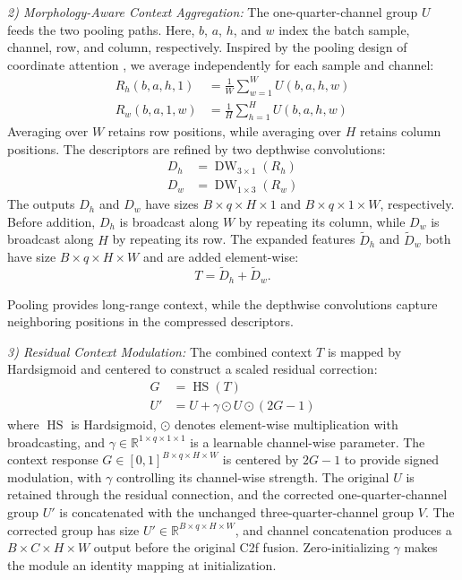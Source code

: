 \documentclass[journal]{IEEEtranTIE}
\begin{document}
\emph{2) Morphology-Aware Context Aggregation:}
The one-quarter-channel group $U$ feeds the two pooling paths. Here, $b$, $a$, $h$, and $w$ index the batch sample, channel, row, and column, respectively. Inspired by the pooling design of coordinate attention \cite{hou2021coordinate}, we average independently for each sample and channel:
\begin{align}
R_h(b,a,h,1) &= \frac{1}{W}\sum_{w=1}^{W}U(b,a,h,w) \label{eq:pac-row}\\
R_w(b,a,1,w) &= \frac{1}{H}\sum_{h=1}^{H}U(b,a,h,w) \label{eq:pac-column}
\end{align}
\noindent Averaging over $W$ retains row positions, while averaging over $H$ retains column positions. The descriptors are refined by two depthwise convolutions:
\begin{equation}
\begin{aligned}
D_h&=\operatorname{DW}_{3\times1}(R_h)\\
D_w&=\operatorname{DW}_{1\times3}(R_w)
\end{aligned}
\label{eq:pac-depthwise}
\end{equation}
\noindent The outputs $D_h$ and $D_w$ have sizes $B\times q\times H\times1$ and $B\times q\times1\times W$, respectively. Before addition, $D_h$ is broadcast along $W$ by repeating its column, while $D_w$ is broadcast along $H$ by repeating its row. The expanded features $\widetilde D_h$ and $\widetilde D_w$ both have size $B\times q\times H\times W$ and are added element-wise:
\begin{equation}
T=\widetilde D_h+\widetilde D_w.
\label{eq:pac-context}
\end{equation}

Pooling provides long-range context, while the depthwise convolutions capture neighboring positions in the compressed descriptors.

\emph{3) Residual Context Modulation:}
The combined context $T$ is mapped by Hardsigmoid and centered to construct a scaled residual correction:
\begin{align}
G &= \operatorname{HS}(T) \label{eq:pac-map}\\
U' &= U+\gamma\odot U\odot(2G-1) \label{eq:pac-modulation}
\end{align}
\noindent where $\operatorname{HS}$ is Hardsigmoid, $\odot$ denotes element-wise multiplication with broadcasting, and $\gamma\in\mathbb{R}^{1\times q\times1\times1}$ is a learnable channel-wise parameter. The context response $G\in[0,1]^{B\times q\times H\times W}$ is centered by $2G-1$ to provide signed modulation, with $\gamma$ controlling its channel-wise strength. The original $U$ is retained through the residual connection, and the corrected one-quarter-channel group $U'$ is concatenated with the unchanged three-quarter-channel group $V$. The corrected group has size $U'\in\mathbb{R}^{B\times q\times H\times W}$, and channel concatenation produces a $B\times C\times H\times W$ output before the original C2f fusion. Zero-initializing $\gamma$ makes the module an identity mapping at initialization.
\end{document}

